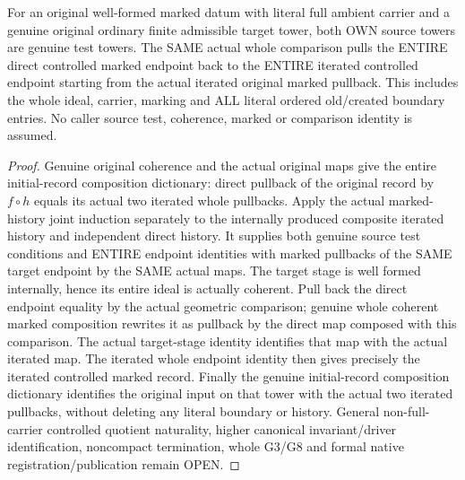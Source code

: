\begin{theorem}
\label{hir:submersion-tower-composition-whole-marked}
\leanok
{}
For an original well-formed marked datum with literal full ambient carrier
and a genuine original ordinary finite admissible target tower, both OWN
source towers are genuine test towers. The SAME actual whole comparison
pulls the ENTIRE direct controlled marked endpoint back to the ENTIRE
iterated controlled endpoint starting from the actual iterated original
marked pullback. This includes the whole ideal, carrier, marking and ALL
literal ordered old/created boundary entries. No caller source test,
coherence, marked or comparison identity is assumed.
\end{theorem}
\begin{proof}
Genuine original coherence and the actual original maps give the entire
initial-record composition dictionary: direct pullback of the original
record by $f\circ h$ equals its actual two iterated whole pullbacks. Apply
the actual marked-history joint induction separately to the internally
produced composite iterated history and independent direct history. It
supplies both genuine source test conditions and ENTIRE endpoint identities
with marked pullbacks of the SAME target endpoint by the SAME actual maps.
The target stage is well formed internally, hence its entire ideal is
actually coherent. Pull back the direct endpoint equality by the actual
geometric comparison; genuine whole coherent marked composition rewrites
it as pullback by the direct map composed with this comparison. The actual
target-stage identity identifies that map with the actual iterated map.
The iterated whole endpoint identity then gives precisely the iterated
controlled marked record. Finally the genuine initial-record composition
dictionary identifies the original input on that tower with the actual
two iterated pullbacks, without deleting any literal boundary or history.
General non-full-carrier controlled quotient naturality, higher canonical
invariant/driver identification, noncompact termination, whole G3/G8 and
formal native registration/publication remain OPEN.
\end{proof}
